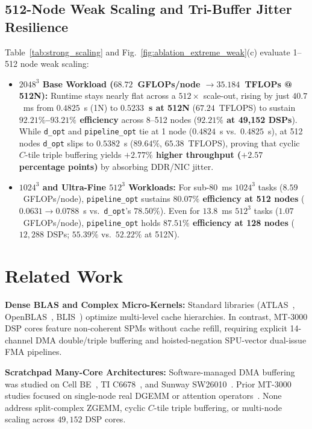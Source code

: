 \documentclass[conference]{IEEEtran}
\begin{document}
\subsection{512-Node Weak Scaling and Tri-Buffer Jitter Resilience}
\label{sec:eval_weak}
Table~\ref{tab:strong_scaling} and Fig.~\ref{fig:ablation_extreme_weak}(c) evaluate 1--512 node weak scaling:
\begin{itemize}\setlength{\itemsep}{0.5pt}\setlength{\parskip}{0pt}
    \item \textbf{$2048^3$ Base Workload ($68.72$~GFLOPs/node $\to 35.184$~TFLOPs @ 512N):} Runtime stays nearly flat across a $512\times$ scale-out, rising by just $40.7$~ms from $0.4825$~s (1N) to \textbf{$0.5233$~s at 512N} ($67.24$~TFLOPS) to sustain \textbf{$92.21\%$--$93.21\%$ efficiency} across 8--512 nodes (\textbf{$92.21\%$ at 49,152 DSPs}). While \texttt{d\_opt} and \texttt{pipeline\_opt} tie at 1 node ($0.4824$~s vs.\ $0.4825$~s), at 512 nodes \texttt{d\_opt} slips to $0.5382$~s ($89.64\%$, $65.38$~TFLOPS), proving that cyclic $C$-tile triple buffering yields \textbf{$+2.77\%$ higher throughput ($+2.57$ percentage points)} by absorbing DDR/NIC jitter.
    \item \textbf{$1024^3$ and Ultra-Fine $512^3$ Workloads:} For sub-$80$~ms $1024^3$ tasks ($8.59$~GFLOPs/node), \texttt{pipeline\_opt} sustains \textbf{$80.07\%$ efficiency at 512 nodes} ($0.0631 \to 0.0788$~s vs.\ \texttt{d\_opt}'s $78.50\%$). Even for $13.8$~ms $512^3$ tasks ($1.07$~GFLOPs/node), \texttt{pipeline\_opt} holds \textbf{$87.51\%$ efficiency at 128 nodes} ($12{,}288$ DSPs; $55.39\%$ vs.\ $52.22\%$ at 512N).
\end{itemize}

\section{Related Work}
\label{sec:related}
\textbf{Dense BLAS and Complex Micro-Kernels:} Standard libraries (ATLAS~\cite{whaley2001atlas}, OpenBLAS~\cite{zhang2012openblas}, BLIS~\cite{vanzee2015blis, vanzee2017complex}) optimize multi-level cache hierarchies. In contrast, MT-3000 DSP cores feature non-coherent SPMs without cache refill, requiring explicit 14-channel DMA double/triple buffering and hoisted-negation SPU-vector dual-issue FMA pipelines.

\textbf{Scratchpad Many-Core Architectures:} Software-managed DMA buffering was studied on Cell BE~\cite{kahle2005cell}, TI C6678~\cite{igual2012dsp}, and Sunway SW26010~\cite{fu2016sunway, jiang2017sw26010}. Prior MT-3000 studies focused on single-node real DGEMM or attention operators~\cite{lu2022mt3000, li2024md, fang2026mtgemm, mo2024irregular, qi2025constraint, qi2026attention}. None address split-complex ZGEMM, cyclic $C$-tile triple buffering, or multi-node scaling across $49{,}152$ DSP cores.
\end{document}
